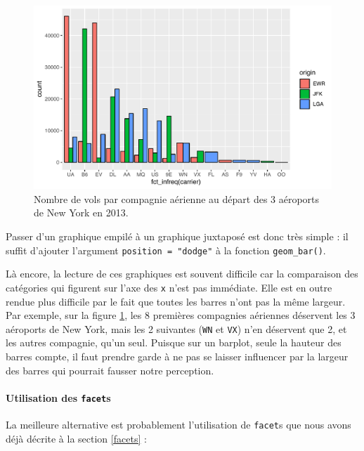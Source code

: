 \documentclass[a4paperpaper,]{article}
\let\oldparagraph\paragraph
\renewcommand{\paragraph}[1]{\oldparagraph{#1}\mbox{}}
\theoremstyle{definition}
\theoremstyle{definition}
\theoremstyle{definition}
\theoremstyle{remark}
\begin{document}
\begin{figure}[htpb]

{\centering \includegraphics[width=0.9\linewidth]{figure/dodge-1} 

}

\caption{Nombre de vols par compagnie aérienne au départ des 3 aéroports de New York en 2013.}\label{fig:dodge}
\end{figure}

Passer d'un graphique empilé à un graphique juxtaposé est donc très
simple : il suffit d'ajouter l'argument \texttt{position\ =\ "dodge"} à
la fonction \texttt{geom\_bar()}.

Là encore, la lecture de ces graphiques est souvent difficile car la
comparaison des catégories qui figurent sur l'axe des \texttt{x} n'est
pas immédiate. Elle est en outre rendue plus difficile par le fait que
toutes les barres n'ont pas la même largeur. Par exemple, sur la figure
\ref{fig:dodge}, les 8 premières compagnies aériennes déservent les 3
aéroports de New York, mais les 2 suivantes (\texttt{WN} et \texttt{VX})
n'en déservent que 2, et les autres compagnie, qu'un seul. Puisque sur
un barplot, seule la hauteur des barres compte, il faut prendre garde à
ne pas se laisser influencer par la largeur des barres qui pourrait
fausser notre perception.

\hypertarget{utilisation-des-facets}{%
\paragraph{\texorpdfstring{Utilisation des
\texttt{facet}s}{Utilisation des facets}}\label{utilisation-des-facets}}

La meilleure alternative est probablement l'utilisation de
\texttt{facet}s que nous avons déjà décrite à la section \ref{facets} :
\end{document}
